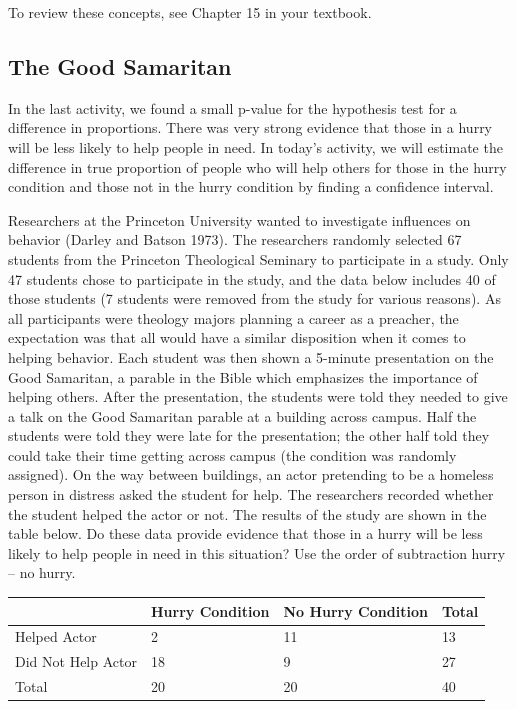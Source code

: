 \documentclass[
]{report}
\begin{document}
To review these concepts, see Chapter 15 in your textbook.

\hypertarget{the-good-samaritan-1}{%
\subsection{The Good Samaritan}\label{the-good-samaritan-1}}

In the last activity, we found a small p-value for the hypothesis test for a difference in proportions. There was very strong evidence that those in a hurry will be less likely to help people in need. In today's activity, we will estimate the difference in true proportion of people who will help others for those in the hurry condition and those not in the hurry condition by finding a confidence interval.

Researchers at the Princeton University wanted to investigate influences on behavior (Darley and Batson 1973). The researchers randomly selected 67 students from the Princeton Theological Seminary to participate in a study. Only 47 students chose to participate in the study, and the data below includes 40 of those students (7 students were removed from the study for various reasons). As all participants were theology majors planning a career as a preacher, the expectation was that all would have a similar disposition when it comes to helping behavior. Each student was then shown a 5-minute presentation on the Good Samaritan, a parable in the Bible which emphasizes the importance of helping others. After the presentation, the students were told they needed to give a talk on the Good Samaritan parable at a building across campus. Half the students were told they were late for the presentation; the other half told they could take their time getting across campus (the condition was randomly assigned). On the way between buildings, an actor pretending to be a homeless person in distress asked the student for help. The researchers recorded whether the student helped the actor or not. The results of the study are shown in the table below. Do these data provide evidence that those in a hurry will be less likely to help people in need in this situation? Use the order of subtraction hurry -- no hurry.

\begin{longtable}[]{@{}llll@{}}
\toprule()
& Hurry Condition & No Hurry Condition & Total \\
\midrule()
\endhead
Helped Actor & 2 & 11 & 13 \\
Did Not Help Actor & 18 & 9 & 27 \\
Total & 20 & 20 & 40 \\
\bottomrule()
\end{longtable}
\end{document}
